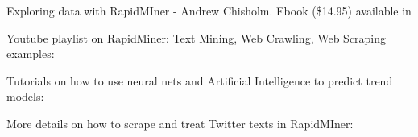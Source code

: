 \documentclass[12pt]{article}
\begin{document}
Exploring data with RapidMIner - Andrew Chisholm. Ebook (\$14.95) available in  \newline
[link]
\newline

Youtube playlist on RapidMiner: Text Mining, Web Crawling, Web Scraping examples: \newline
[link]
\newline

Tutorials on how to use neural nets and Artificial Intelligence to predict trend models: \newline
[link]
\newline

More details on how to scrape and treat Twitter texts in RapidMIner: \newline
[link]
\end{document}
